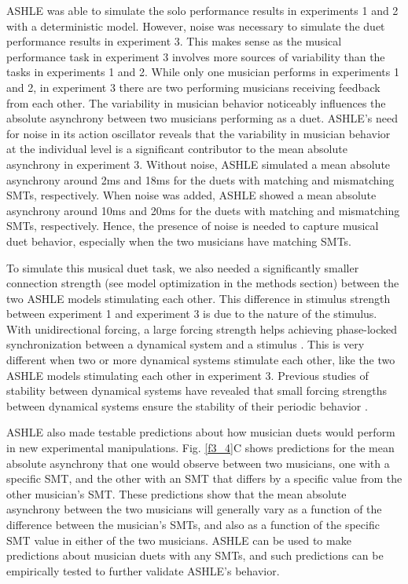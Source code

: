 \documentclass{report}
\begin{document}
ASHLE was able to simulate the solo performance results in experiments 1 and 2 with a deterministic model. However, noise was necessary to simulate the duet performance results in experiment 3. This makes sense as the musical performance task in experiment 3 involves more sources of variability than the tasks in experiments 1 and 2. While only one musician performs in experiments 1 and 2, in experiment 3 there are two performing musicians receiving feedback from each other. The variability in musician behavior noticeably influences the absolute asynchrony between two musicians performing as a duet. ASHLE's need for noise in its action oscillator reveals that the variability in musician behavior at the individual level is a significant contributor to the mean absolute asynchrony in experiment 3. Without noise, ASHLE simulated a mean absolute asynchrony around 2ms and 18ms for the duets with matching and mismatching SMTs, respectively. When noise was added, ASHLE showed a mean absolute asynchrony around 10ms and 20ms for the duets with matching and mismatching SMTs, respectively. Hence, the presence of noise is needed to capture musical duet behavior, especially when the two musicians have matching SMTs.

To simulate this musical duet task, we also needed a significantly smaller connection strength (see model optimization in the methods section) between the two ASHLE models stimulating each other. This difference in stimulus strength between experiment 1 and experiment 3 is due to the nature of the stimulus. With unidirectional forcing, a large forcing strength helps achieving phase-locked synchronization between a dynamical system and a stimulus \cite{kim2015signal}. This is very different when two or more dynamical systems stimulate each other, like the two ASHLE models stimulating each other in experiment 3. Previous studies of stability between dynamical systems have revealed that small forcing strengths between dynamical systems ensure the stability of their periodic behavior \cite{kim2015signal}.

ASHLE also made testable predictions about how musician duets would perform in new experimental manipulations. Fig.{} \ref{f3_4}C shows predictions for the mean absolute asynchrony that one would observe between two musicians, one with a specific SMT, and the other with an SMT that differs by a specific value from the other musician's SMT. These predictions show that the mean absolute asynchrony between the two musicians will generally vary as a function of the difference between the musician's SMTs, and also as a function of the specific SMT value in either of the two musicians. ASHLE can be used to make predictions about musician duets with any SMTs, and such predictions can be empirically tested to further validate ASHLE's behavior.
\end{document}
